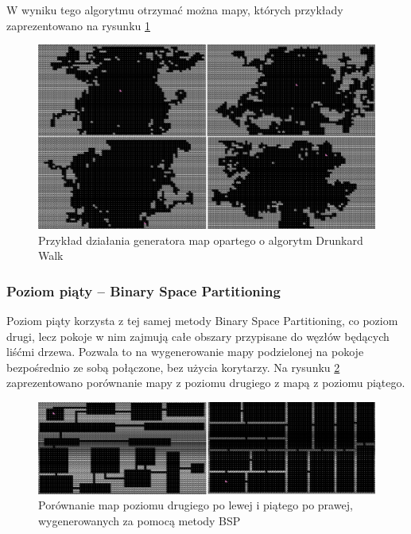 \documentclass[12pt,twoside]{article}
\begin{document}
W wyniku tego algorytmu otrzymać można mapy, których przykłady zaprezentowano na rysunku \ref{generators:drunkard_walk} 

\FloatBarrier
\begin{figure}[ht]
	\centering
	\includegraphics[width=16cm]{images/generators/drunkard_walk.png}
	\caption{Przykład działania generatora map opartego o algorytm Drunkard Walk}
	\label{generators:drunkard_walk}
\end{figure}
\FloatBarrier

\clearpage

\subsubsection{Poziom piąty -- Binary Space Partitioning}
Poziom piąty korzysta z tej samej metody Binary Space Partitioning, co poziom drugi, lecz pokoje w nim zajmują całe obszary przypisane do węzłów będących liśćmi drzewa. Pozwala to na wygenerowanie mapy podzielonej na pokoje bezpośrednio ze sobą połączone, bez użycia korytarzy. Na rysunku \ref{generators:bsp_diff} zaprezentowano porównanie mapy z poziomu drugiego z mapą z poziomu piątego.
	
\FloatBarrier
\begin{figure}[ht]
	\centering
	\includegraphics[width=16cm]{images/generators/bsp_diff.png}
	\caption{Porównanie map poziomu drugiego po lewej i piątego po prawej, wygenerowanych za pomocą metody BSP}
	\label{generators:bsp_diff}
\end{figure}
\FloatBarrier
\end{document}

